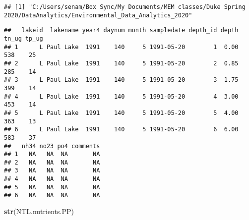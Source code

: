 \documentclass[
]{article}
\newenvironment{Shaded}{\begin{snugshade}}{\end{snugshade}}
\newcommand{\CommentTok}[1]{\textcolor[rgb]{0.56,0.35,0.01}{\textit{#1}}}
\newcommand{\DataTypeTok}[1]{\textcolor[rgb]{0.13,0.29,0.53}{#1}}
\newcommand{\KeywordTok}[1]{\textcolor[rgb]{0.13,0.29,0.53}{\textbf{#1}}}
\newcommand{\NormalTok}[1]{#1}
\newcommand{\OperatorTok}[1]{\textcolor[rgb]{0.81,0.36,0.00}{\textbf{#1}}}
\newcommand{\StringTok}[1]{\textcolor[rgb]{0.31,0.60,0.02}{#1}}
\begin{document}
\begin{Shaded}
\end{Shaded}

\begin{verbatim}
## [1] "C:/Users/senam/Box Sync/My Documents/MEM classes/Duke Spring 2020/DataAnalytics/Environmental_Data_Analytics_2020"
\end{verbatim}

\begin{Shaded}
\end{Shaded}

\begin{verbatim}
##   lakeid  lakename year4 daynum month sampledate depth_id depth tn_ug tp_ug
## 1      L Paul Lake  1991    140     5 1991-05-20        1  0.00   538    25
## 2      L Paul Lake  1991    140     5 1991-05-20        2  0.85   285    14
## 3      L Paul Lake  1991    140     5 1991-05-20        3  1.75   399    14
## 4      L Paul Lake  1991    140     5 1991-05-20        4  3.00   453    14
## 5      L Paul Lake  1991    140     5 1991-05-20        5  4.00   363    13
## 6      L Paul Lake  1991    140     5 1991-05-20        6  6.00   583    37
##   nh34 no23 po4 comments
## 1   NA   NA  NA       NA
## 2   NA   NA  NA       NA
## 3   NA   NA  NA       NA
## 4   NA   NA  NA       NA
## 5   NA   NA  NA       NA
## 6   NA   NA  NA       NA
\end{verbatim}

\begin{Shaded}
\begin{Highlighting}[]
\KeywordTok{str}\NormalTok{(NTL.nutrients.PP)}
\end{Highlighting}
\end{Shaded}
\end{document}
